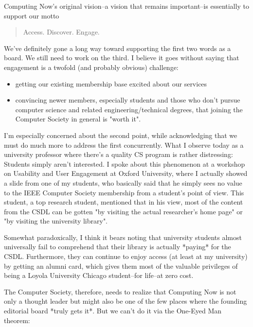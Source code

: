 \documentclass[11pt,english]{luclet}
\begin{document}
Computing Now's original vision--a vision that remains important--is essentially to support our motto

\begin{quote}
  Access. Discover. Engage. 
\end{quote}

We've definitely gone a long way toward supporting the first two words
as a board. We still need to work on the third. I believe it goes
without saying that engagement is a twofold (and probably obvious)
challenge:

\begin{itemize}
  
\item getting our existing membership base excited about our services

\item convincing newer members, especially students and those who don't 
  pursue computer science and related engineering/technical degrees, that
  joining the Computer Society in general is "worth it".
\end{itemize}

I'm especially concerned about the second point, while acknowledging that 
we must do much more to address the first concurrently. What I observe today
as a university professor where there's a quality CS program is rather
distressing: Students simply aren't interested. I spoke about this phenomenon
at a workshop on Usability and User Engagement at Oxford University, where
I actually showed a slide from one of my students, who basically said that
he simply sees no value to the IEEE Computer Society membership from a 
student's point of view. This student, a top research student, mentioned
that in his view, most of the content from the CSDL can be gotten "by visiting
the actual researcher's home page" or "by visiting the university library". 

Somewhat paradoxically, I think it bears noting that university students
almost universally fail to comprehend that their library is actually *paying*
for the CSDL. Furthermore, they can continue to enjoy access (at least at my
university) by getting an alumni card, which gives them most of the valuable
privileges of being a Loyola University Chicago student--for life--at zero
cost.

The Computer Society, therefore, needs to realize that Computing Now is not
only a thought leader but might also be one of the few places where the
founding editorial board *truly gets it*. But we can't do it via the One-Eyed
Man theorem:
\end{document}
